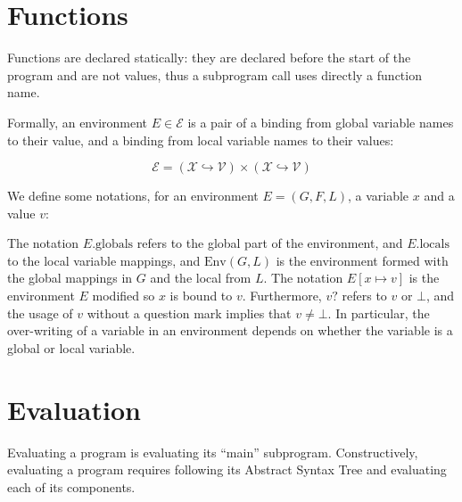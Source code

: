 \documentclass{book}
\newcommand\field[1]{.\text{#1}}
\newcommand\globals[0]{\field{globals}}
\newcommand\locals[0]{\field{locals}}
\newcommand\X[0]{\mathcal{X}}
\DeclareMathOperator{\dom}{dom}
\begin{document}
\section{Functions}
Functions are declared statically: they are declared before the start of the
program and are not values, thus a subprogram call uses directly a function name. 

Formally, an environment $E \in \mathcal{E}$ is a pair of a binding from global
variable names to their value, and a binding from local variable names to their
values:

%
\[
  \mathcal{E} = \left( \X \hookrightarrow \mathcal{V} \right)
         \times \left( \X \hookrightarrow \mathcal{V} \right)
\]

We define some notations, for an environment $E = (G, F, L)$, a variable $x$
and a value $v$:
%
%
The notation $E\globals$ refers to the global part of the environment, and
$E\locals$ to the local variable mappings, and $\text{Env} (G, L)$ is the
environment formed with the global mappings in $G$ and the local from $L$.
%
The notation $E[x \mapsto v]$ is the environment $E$ modified so $x$ is bound
to $v$.
%
Furthermore, $v?$ refers to $v$ or $\bot$, and the usage of $v$ without a
question mark implies that $v \neq \bot$.
%
In particular, the over-writing of a variable in an environment depends on
whether the variable is a global or local variable.

\section{Evaluation}

Evaluating a program is evaluating its ``main'' subprogram.
Constructively, evaluating a program requires following its
Abstract Syntax Tree and evaluating each of its components.
\end{document}
